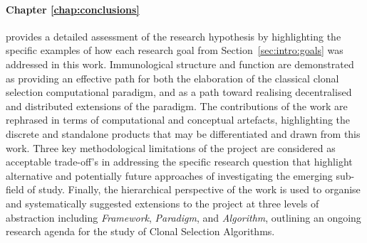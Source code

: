 \paragraph{Chapter \ref{chap:conclusions}} provides a detailed assessment of the research hypothesis by highlighting the specific examples of how each research goal from Section~\ref{sec:intro:goals} was addressed in this work. Immunological structure and function are demonstrated as providing an effective path for both the elaboration of the classical clonal selection computational paradigm, and as a path toward realising decentralised and distributed extensions of the paradigm. The contributions of the work are rephrased in terms of computational and conceptual artefacts, highlighting the discrete and standalone products that may be differentiated and drawn from this work. Three key methodological limitations of the project are considered as acceptable trade-off's in addressing the specific research question that highlight alternative and potentially future approaches of investigating the emerging sub-field of study. Finally, the hierarchical perspective of the work is used to organise and systematically suggested extensions to the project at three levels of abstraction including \emph{Framework}, \emph{Paradigm}, and \emph{Algorithm}, outlining an ongoing research agenda for the study of Clonal Selection Algorithms. 

